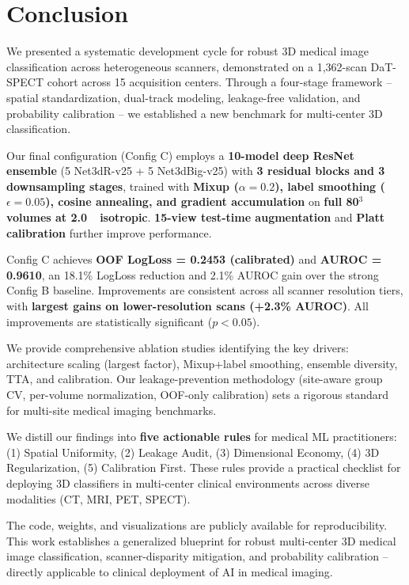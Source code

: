 \section{Conclusion}
\label{sec:conclusion}

We presented a systematic development cycle for robust 3D medical image classification across heterogeneous scanners, demonstrated on a 1,362-scan DaT-SPECT cohort across 15 acquisition centers. Through a four-stage framework -- spatial standardization, dual-track modeling, leakage-free validation, and probability calibration -- we established a new benchmark for multi-center 3D classification.

Our final configuration (Config C) employs a \textbf{10-model deep ResNet ensemble} (5 Net3dR-v25 + 5 Net3dBig-v25) with \textbf{3 residual blocks and 3 downsampling stages}, trained with \textbf{Mixup ($\alpha=0.2$), label smoothing ($\epsilon=0.05$), cosine annealing, and gradient accumulation} on \textbf{full 80$^3$ volumes at 2.0~\voxelunit~isotropic}. \textbf{15-view test-time augmentation} and \textbf{Platt calibration} further improve performance.

Config C achieves \textbf{OOF LogLoss = 0.2453 (calibrated)} and \textbf{AUROC = 0.9610}, an 18.1\% LogLoss reduction and 2.1\% AUROC gain over the strong Config B baseline. Improvements are consistent across all scanner resolution tiers, with \textbf{largest gains on lower-resolution scans (+2.3\% AUROC)}. All improvements are statistically significant ($p<0.05$).

We provide comprehensive ablation studies identifying the key drivers: architecture scaling (largest factor), Mixup+label smoothing, ensemble diversity, TTA, and calibration. Our leakage-prevention methodology (site-aware group CV, per-volume normalization, OOF-only calibration) sets a rigorous standard for multi-site medical imaging benchmarks.

We distill our findings into \textbf{five actionable rules} for medical ML practitioners: (1) Spatial Uniformity, (2) Leakage Audit, (3) Dimensional Economy, (4) 3D Regularization, (5) Calibration First. These rules provide a practical checklist for deploying 3D classifiers in multi-center clinical environments across diverse modalities (CT, MRI, PET, SPECT).

The code, weights, and visualizations are publicly available for reproducibility. This work establishes a generalized blueprint for robust multi-center 3D medical image classification, scanner-disparity mitigation, and probability calibration -- directly applicable to clinical deployment of AI in medical imaging.